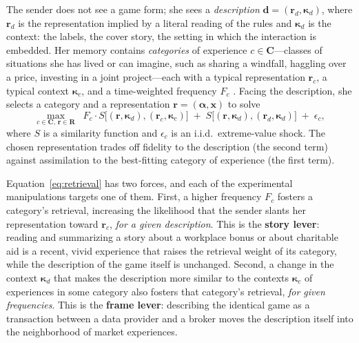 \documentclass[11pt]{article}
\theoremstyle{plain}
\theoremstyle{remark}
\begin{document}
The sender does not see a game form; she sees a \emph{description} $\mathbf{d}=(\mathbf{r}_d,\boldsymbol{\kappa}_d)$, where $\mathbf{r}_d$ is the representation implied by a literal reading of the rules and $\boldsymbol{\kappa}_d$ is the context: the labels, the cover story, the setting in which the interaction is embedded. Her memory contains \emph{categories} of experience $c\in\mathbf{C}$---classes of situations she has lived or can imagine, such as sharing a windfall, haggling over a price, investing in a joint project---each with a typical representation $\mathbf{r}_c$, a typical context $\boldsymbol{\kappa}_c$, and a time-weighted frequency $F_c$ \citep{BordaloGennaioliShleifer2020, BordaloGennaioliLanzaniShleifer2026}. Facing the description, she selects a category and a representation $\mathbf{r}=(\boldsymbol{\alpha},\mathbf{x})$ to solve
\begin{equation}
\max_{c\in\mathbf{C},\,\mathbf{r}\in\mathbf{R}}\;\;F_c\cdot S\bigl[(\mathbf{r},\boldsymbol{\kappa}_d),(\mathbf{r}_c,\boldsymbol{\kappa}_c)\bigr]\;+\;S\bigl[(\mathbf{r},\boldsymbol{\kappa}_d),(\mathbf{r}_d,\boldsymbol{\kappa}_d)\bigr]\;+\;\epsilon_c,
\label{eq:retrieval}
\end{equation}
where $S$ is a similarity function \citep{Tversky1977, GilboaSchmeidler1995} and $\epsilon_c$ is an i.i.d.\ extreme-value shock. The chosen representation trades off fidelity to the description (the second term) against assimilation to the best-fitting category of experience (the first term).

Equation~\eqref{eq:retrieval} has two forces, and each of the experimental manipulations targets one of them. First, a higher frequency $F_c$ fosters a category's retrieval, increasing the likelihood that the sender slants her representation toward $\mathbf{r}_c$, \emph{for a given description}. This is the \textbf{story lever}: reading and summarizing a story about a workplace bonus or about charitable aid is a recent, vivid experience that raises the retrieval weight of its category, while the description of the game itself is unchanged. Second, a change in the context $\boldsymbol{\kappa}_d$ that makes the description more similar to the contexts $\boldsymbol{\kappa}_c$ of experiences in some category also fosters that category's retrieval, \emph{for given frequencies}. This is the \textbf{frame lever}: describing the identical game as a transaction between a data provider and a broker moves the description itself into the neighborhood of market experiences.
\end{document}
